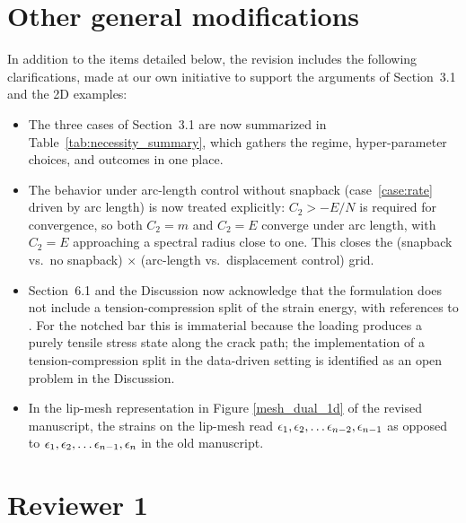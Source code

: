 \documentclass[10pt]{article}
\begin{document}
\section*{Other general modifications}

In addition to the items detailed below, the revision includes the following clarifications, made at our own initiative to support the arguments of Section~3.1 and the 2D examples:
\begin{itemize}
	\item The three cases of Section~3.1 are now summarized in Table~\ref{tab:necessity_summary}, which gathers the regime, hyper-parameter choices, and outcomes in one place.
	\item The behavior under arc-length control without snapback (case~\ref{case:rate} driven by arc length) is now treated explicitly: $C_2 > -E/N$ is required for convergence, so both $C_2 = m$ and $C_2 = E$ converge under arc length, with $C_2 = E$ approaching a spectral radius close to one. This closes the (snapback vs.\ no snapback) $\times$ (arc-length vs.\ displacement control) grid.
	\item Section~6.1 and the Discussion now acknowledge that the formulation does not include a tension-compression split of the strain energy, with references to \cite{amor2009regularized, miehe2010phase}. For the notched bar this is immaterial because the loading produces a purely tensile stress state along the crack path; the implementation of a tension-compression split in the data-driven setting is identified as an open problem in the Discussion.
	\item In the lip-mesh representation in Figure \ref{mesh_dual_1d} of the revised manuscript, the strains on the lip-mesh read ${\epsilon}_1,{\epsilon}_2,\dots {\epsilon}_{n-2}, {\epsilon}_{n-1}$ as opposed to ${\epsilon}_1,{\epsilon}_2,\dots {\epsilon}_{n-1}, {\epsilon}_{n}$ in the old manuscript.
\end{itemize}

\color{black}

\section*{Reviewer 1}
\end{document}
